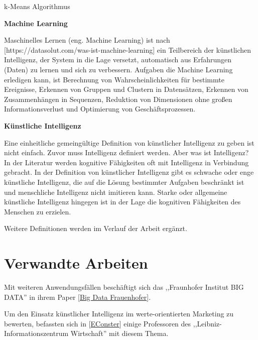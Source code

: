 k-Means Algorithmus\vspace{0.5cm}

\textbf{Machine Learning}\vspace{0.2cm}

Maschinelles Lernen (eng. Machine Learning) ist nach [https://datasolut.com/was-ist-machine-learning] ein Teilbereich der künstlichen Intelligenz, der System in die Lage versetzt, automatisch aus Erfahrungen (Daten) zu lernen und sich zu verbessern. Aufgaben die Machine Learning erledigen kann, ist Berechnung von Wahrscheinlichkeiten für bestimmte Ereignisse, Erkennen von Gruppen und Clustern in Datensätzen, Erkennen von Zusammenhängen in Sequenzen, Reduktion von Dimensionen ohne großen Informationsverlust und Optimierung von Geschäftsprozessen.\vspace{0.5cm}

\textbf{Künstliche Intelligenz}\vspace{0.2cm}

Eine einheitliche gemeingültige Definition von künstlicher Intelligenz zu geben ist nicht einfach. Zuvor muss Intelligenz definiert werden. Aber was ist Intelligenz? In der Literatur werden kognitive Fähigkeiten oft mit Intelligenz in Verbindung gebracht.
In der Definition von künstlicher Intelligenz gibt es schwache oder enge künstliche Intelligenz, die auf die Lösung bestimmter Aufgaben beschränkt ist und menschliche Intelligenz nicht imitieren kann. Starke oder allgemeine künstliche Intelligenz hingegen ist in der Lage die kognitiven Fähigkeiten des Menschen zu erzielen.\vspace{0.5cm}

Weitere Definitionen werden im Verlauf der Arbeit ergänzt.

\section{Verwandte Arbeiten}
Mit weiteren Anwendungsfällen beschäftigt sich das ,,Fraunhofer Institut BIG DATA'' in ihrem Paper [\href{https://www.bigdata-ai.fraunhofer.de/content/dam/bigdata/de/documents/Publikationen/KI-Potenzialanalyse_2017.pdf}{Big Data Frauenhofer}].\vspace{0.2cm}

Um den Einsatz künstlicher Intelligenz im werte-orientierten Marketing zu bewerten, befassten sich in [\href{https://www.econstor.eu/bitstream/10419/222610/1/1725938928.pdf}{EConster}] einige Professoren des ,,Leibniz-Informationszentrum Wirtschaft'' mit diesem Thema.\vspace{0.2cm}


